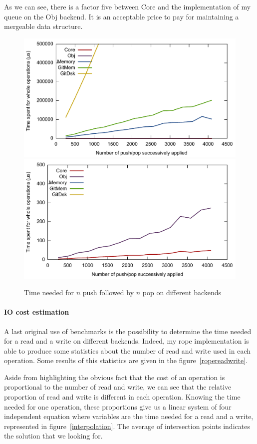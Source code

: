 \documentclass{article}
\newcommand{\obj}{Obj\xspace}
\begin{document}
As we can see, there is a factor five between Core and the implementation of my queue on the \obj backend.
It is an acceptable price to pay for maintaining a mergeable data structure.

\begin{figure}[hbt]
\centering
\includegraphics[scale=0.6]{images/queue_backend.pdf}
\includegraphics[scale=0.6]{images/queue_zoom.pdf}
\caption{Time needed for $n$ push followed by $n$ pop on different backends}
\label{queuebackend}
\end{figure}

\paragraph{IO cost estimation}
A last original use of benchmarks is the possibility to determine the time needed for a read and a write on different backends.
Indeed, my rope implementation is able to produce some statistics about the number of read and write used in each operation.
Some results of this statistics are given in the figure~\ref{ropereadwrite}.

Aside from highlighting the obvious fact that the cost of an operation is proportional to the number of read and write, we can see that the relative proportion of read and write is different in each operation.
Knowing the time needed for one operation, these proportions give us a linear system of four independent equation where variables are the time needed for a read and a write, represented in figure~\ref{interpolation}.
The average of intersection points indicates the solution that we looking for.
\end{document}
